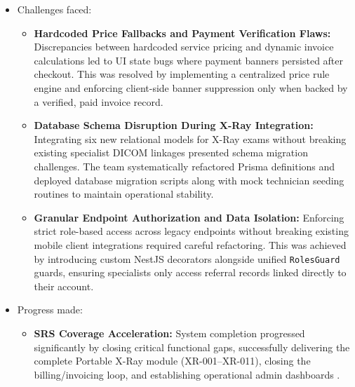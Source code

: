 \documentclass[onecolumn,journal]{IEEEtran}
\begin{document}
\begin{itemize}
\begin{itemize}
			\item \textbf{Security Hardening, RBAC \& Multi-Channel SMS Gateway (Track D):} Hardened API security by enforcing \texttt{JwtAuthGuard} protections across previously unauthenticated patient and provider endpoints, eliminating unauthorized exposure of Protected Health Information (PHI) \cite{jones2015jwt}. Implemented a fine-grained \texttt{RolesGuard} RBAC matrix, corrected default role assignments during signup, and restricted specialist referral access to assigned cases. Built an \texttt{audit\_logs} database model and middleware to track operational access history. Integrated an SMS gateway interface (Twilio/BongoSMS) to automate appointment confirmation, report completion, prescription, and diet plan dispatch notifications.
		\end{itemize}
		
		\item Challenges faced:
		\begin{itemize}
			\item \textbf{Hardcoded Price Fallbacks and Payment Verification Flaws:} Discrepancies between hardcoded service pricing and dynamic invoice calculations led to UI state bugs where payment banners persisted after checkout. This was resolved by implementing a centralized price rule engine and enforcing client-side banner suppression only when backed by a verified, paid invoice record.
			
			\item \textbf{Database Schema Disruption During X-Ray Integration:} Integrating six new relational models for X-Ray exams without breaking existing specialist DICOM linkages presented schema migration challenges. The team systematically refactored Prisma definitions and deployed database migration scripts along with mock technician seeding routines to maintain operational stability.
			
			\item \textbf{Granular Endpoint Authorization and Data Isolation:} Enforcing strict role-based access across legacy endpoints without breaking existing mobile client integrations required careful refactoring. This was achieved by introducing custom NestJS decorators alongside unified \texttt{RolesGuard} guards, ensuring specialists only access referral records linked directly to their account.
		\end{itemize}
		
		\item Progress made:
		\begin{itemize}
			\item \textbf{SRS Coverage Acceleration:} System completion progressed significantly by closing critical functional gaps, successfully delivering the complete Portable X-Ray module (XR-001--XR-011), closing the billing/invoicing loop, and establishing operational admin dashboards \cite{srs2026}.
			

\end{itemize}
\end{itemize}
\end{document}
